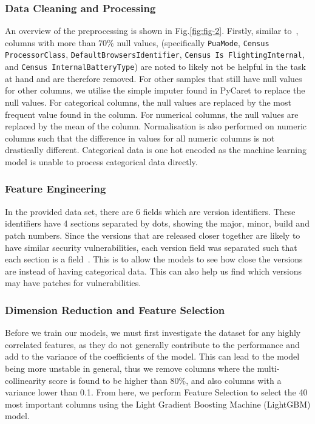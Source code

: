 \documentclass[pdflatex,sn-basic,Numbered]{sn-jnl}%
\theoremstyle{thmstyleone}%
\theoremstyle{thmstyletwo}%
\theoremstyle{thmstylethree}%
\begin{document}
\subsubsection{Data Cleaning and Processing} 
An overview of the preprocessing is shown in Fig.\ref{fig:fig-2}.
Firstly, similar to~\cite{shahini2019}, columns with more than 70\% null values, {(specifically \texttt{PuaMode}, \texttt{Census
ProcessorClass}, \texttt{DefaultBrowsersIdentifier}, \texttt{Census Is FlightingInternal}, and \texttt{Census InternalBatteryType})} are noted to likely not be helpful in the task at hand and are therefore removed.
For other samples that still have null values for other columns, we utilise the simple imputer found in PyCaret to replace the null values.
For categorical columns, the null values are replaced by the most frequent value found in the column.
For numerical columns, the null values are replaced by the mean of the column.
Normalisation is also performed on numeric columns such that the difference in values for all numeric columns is not drastically different.
Categorical data is one hot encoded as the machine learning model is unable to process categorical data directly.

\subsubsection{Feature Engineering} 
In the provided data set, there are 6 fields which are version identifiers.
These identifiers have 4 sections separated by dots, showing the major, minor, build and patch numbers.
Since the versions that are released closer together are likely to have similar security vulnerabilities, each version field was separated such that each section is a field~\cite{iop2020}.
This is to allow the models to see how close the versions are instead of having categorical data.
This can also help us find which versions may have patches for vulnerabilities.

\subsubsection{Dimension Reduction and Feature Selection}
Before we train our models, we must first investigate the dataset for any highly correlated features, as they do not generally contribute to the performance and add to the variance of the coefficients of the model.
This can lead to the model being more unstable in general, thus we remove columns where the multi-collinearity score is found to be higher than 80\%, and also columns with a variance lower than 0.1. From here, we perform Feature Selection to select the 40 most important columns using the Light Gradient Boosting Machine (LightGBM) model.
\end{document}
